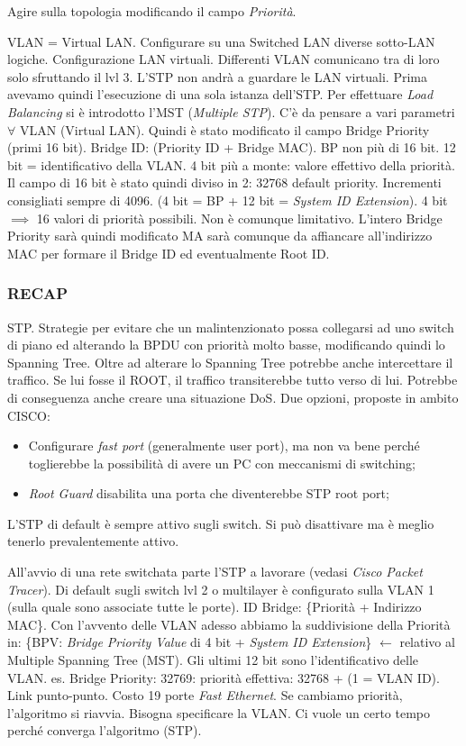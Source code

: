 Agire sulla topologia modificando il campo \textit{Priorità}.

VLAN = Virtual LAN. Configurare su una Switched LAN diverse sotto-LAN logiche. Configurazione LAN virtuali. Differenti VLAN comunicano tra di loro solo sfruttando il lvl 3. L'STP non andrà a guardare le LAN virtuali. Prima avevamo quindi l'esecuzione di una sola istanza dell'STP. Per effettuare \textit{Load Balancing} si è introdotto l'MST (\textit{Multiple STP}). C'è da pensare a vari parametri $\forall$ VLAN (Virtual LAN). Quindi è stato modificato il campo Bridge Priority (primi 16 bit). Bridge ID: (Priority ID + Bridge MAC). BP non più di 16 bit. 12 bit = identificativo della VLAN. 4 bit più a monte: valore effettivo della priorità. Il campo di 16 bit è stato quindi diviso in 2: 32768 default priority. Incrementi consigliati sempre di 4096. (4 bit = BP + 12 bit = \textit{System ID Extension}). 4 bit $\implies$ 16 valori di priorità possibili. Non è comunque limitativo. L'intero Bridge Priority sarà quindi modificato MA sarà comunque da affiancare all'indirizzo MAC per formare il Bridge ID ed eventualmente Root ID.


\subsubsection{RECAP}

STP. Strategie per evitare che un malintenzionato possa collegarsi ad uno switch di piano ed alterando la BPDU con priorità molto basse, modificando quindi lo Spanning Tree. Oltre ad alterare lo Spanning Tree potrebbe anche intercettare il traffico. Se lui fosse il ROOT, il traffico transiterebbe tutto verso di lui. Potrebbe di conseguenza anche creare una situazione DoS. Due opzioni, proposte in ambito CISCO:

\begin{itemize}

\item Configurare \textit{fast port} (generalmente user port), ma non va bene perché toglierebbe la possibilità di avere un PC con meccanismi di switching;
\item \textit{Root Guard} disabilita una porta che diventerebbe STP root port;

\end{itemize}

L'STP di default è sempre attivo sugli switch. Si può disattivare ma è meglio tenerlo prevalentemente attivo.

All'avvio di una rete switchata parte l'STP a lavorare (vedasi \textit{Cisco Packet Tracer}). Di default sugli switch lvl 2 o multilayer è configurato sulla VLAN 1 (sulla quale sono associate tutte le porte). ID Bridge: \{Priorità + Indirizzo MAC\}. Con l'avvento delle VLAN adesso abbiamo la suddivisione della Priorità in: \{BPV: \textit{Bridge Priority Value} di 4 bit + \textit{System ID Extension}\} $\leftarrow$ relativo al Multiple Spanning Tree (MST). Gli ultimi 12 bit sono l'identificativo delle VLAN. es. Bridge Priority: 32769: priorità effettiva: 32768 + (1 = VLAN ID). Link punto-punto. Costo 19 porte \textit{Fast Ethernet}. Se cambiamo priorità, l'algoritmo si riavvia. Bisogna specificare la VLAN. Ci vuole un certo tempo perché converga l'algoritmo (STP).

